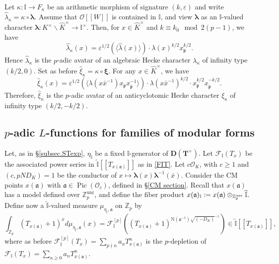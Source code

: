 \documentclass[a4paper,11pt]{amsart}
\numberwithin{equation}{section}
\theoremstyle{plain}
\theoremstyle{definition}
\theoremstyle{remark}
\newcommand{\Q}{\mathbb{Q}}
\newcommand{\Z}{\mathbb{Z}}
\newcommand{\I}{\mathbb{I}}
\newcommand{\defeq}{\vcentcolon=}
\newcommand{\pwseries}[1]{[[ #1]]}
\DeclareMathOperator{\Pic}{Pic}
\newcommand{\unr}{\mathrm{unr}}
\begin{document}
Let $\kappa\colon\I\rightarrow F_\kappa$ be an arithmetic morphism of signature $(k ,\varepsilon)$ 
and write $\hat{\lambda}_\kappa =\kappa \circ{\boldsymbol{\lambda}}$. 
Assume that $\mathcal{O}\pwseries W$ is contained in $\I$, and view $\boldsymbol{\lambda}$ as an $\I$-valued character ${\boldsymbol{\lambda}}\colon K^\times\backslash\widehat{K}^\times\rightarrow\I^\times$.
Then, for $x \in \widehat{K}^\times$ and $k \equiv k_0\mod{2(p-1)}$, we have 
\[\hat{\lambda}_\kappa (x)=\varepsilon ^{1/2}(\langle \hat{\lambda}(x)\rangle)\cdot {\lambda}(x) ^{k /2} x_{\mathfrak{p}}^{k/2}.\]
Hence $\hat{\lambda}_\kappa$ is the $p$-adic avatar 
of an algebraic Hecke character $\lambda_\kappa $ of infinity type $(k/2,0)$. Set as before $\hat{\xi}_\kappa =\kappa \circ {\boldsymbol{\xi}}$. For any $x \in \widehat{K}^\times$, we have 
\begin{equation}\label{hatxi}
\hat{\xi}_\kappa(x)= \varepsilon ^{1/2}(\langle{\lambda}(x
\bar{x}^{-1})x_\mathfrak{p} x^{-1}_{\bar{\mathfrak{p}}}\rangle)\cdot {\lambda}(x\bar{x}^{-1}) ^{k /2} \cdot x_{\mathfrak{p}}^{k/2} x_{\bar{\mathfrak{p}}}^{-k/2}.\end{equation}
Therefore, 
$\hat{\xi}_\kappa $ is the $p$-adic avatar of an anticyclotomic Hecke character $\xi_\kappa $ of infinity type $(k /2, -k /2)$. 

\subsection{$p$-adic $L$-functions for families of modular forms}
Let, as in \S\ref{subsec.STexp}, $\eta_\mathbb{I}$ be a fixed $\mathbb{I}$-generator of $\mathbf{D}(\mathbf{T}^+)$. 
Let 
$\mathcal{F}_\I(T_x)$ be the associated power series in $\widetilde{\I}[[T_{x(\mathfrak{a})}]]$  as in \eqref{FIT}. 
Let $c\mathcal{O}_K$, with $c\geq 1$ and $(c,pND_K)=1$ be the conductor of $x \mapsto\boldsymbol{\lambda}(x)\boldsymbol{\lambda}^{-1}(\bar{x})$.
Consider the CM points $x(\mathfrak{a})$ with $\mathfrak{a} \in \Pic(\mathcal{O}_c)$, defined in \S \ref{CM section}.
Recall that $x(\mathfrak{a})$ has a model defined over ${\Z_p^\unr}$, and define 
the fiber product $x(\mathfrak{a})_{{\I}} \defeq x(\mathfrak{a}) \otimes_{\Z_p^\unr}\widetilde{\I}.$
Define now a $\widetilde{\I}$-valued measure $\mu_{\eta_\I,\mathfrak{a}}$ on $\Z_p$ by
\begin{equation*} \label{mu_a}
\int_{\Z_p} (T_{x(\mathfrak{a})}+1)^x d\mu_{\eta_\I,\mathfrak{a}}(x) = 
{\mathcal{F}}_\I^{[p]} \left( (T_{x(\mathfrak{a})}+1)^{\mathrm{N}(\mathfrak{a}^{-1})\sqrt{(-D_K)}^{-1}}\right) \in \widetilde{\I}[[T_{x(\mathfrak{a})}]],
\end{equation*}
where as before 
$\mathcal{F}_\I^{[p]}(T_x)=\sum_{p\nmid n}a_nT_{x(\mathfrak{a})}^n$ is the $p$-depletion of $\mathcal{F}_\I(T_x)= \sum_{n\geq 0}a_nT_{x(\mathfrak{a})}^n$. 
\end{document}
